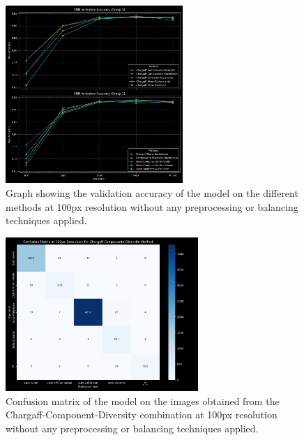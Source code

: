 \begin{figure}[H]
	\centering
	\includegraphics[width=0.6\textwidth]{../imgs/graphs/standard/cnn_validation_accuracy_groups_mask_5_std.png}
	\caption{Graph showing the validation accuracy of the model on the different methods at 100px resolution without any preprocessing or
		balancing techniques applied.}
	\label{fig:cnn_validation_accuracy_std}
\end{figure}

\begin{figure}[H]
	\centering
	\includegraphics[width=0.65\textwidth]{../imgs/graphs/standard/cnn_confusion_matrix_100px_mask_5_std-old.png}
	\caption{Confusion matrix of the model on the images obtained from the Chargaff-Component-Diversity combination at 100px resolution without any
		preprocessing or balancing techniques applied.}
	\label{fig:cnn_confusion_matrix_100px_std}
\end{figure}

